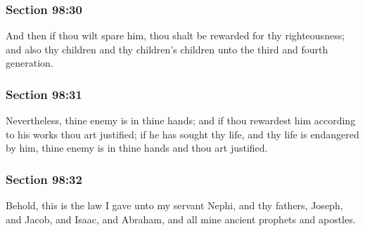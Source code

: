 	\subsubsection{Section 98:30} %
		\label{DC98-30}

		And then if thou wilt spare him, thou shalt be rewarded for thy righteousness; and also thy children and thy children's children unto the third and fourth generation.


	\subsubsection{Section 98:31} %
		\label{DC98-31}

		Nevertheless, thine enemy is in thine hands; and if thou rewardest him according to his works thou art justified; if he has sought thy life, and thy life is endangered by him, thine enemy is in thine hands and thou art justified.


	\subsubsection{Section 98:32} %
		\label{DC98-32}

		Behold, this is the law I gave unto my servant Nephi, and thy fathers, Joseph, and Jacob, and Isaac, and Abraham, and all mine ancient prophets and apostles.


